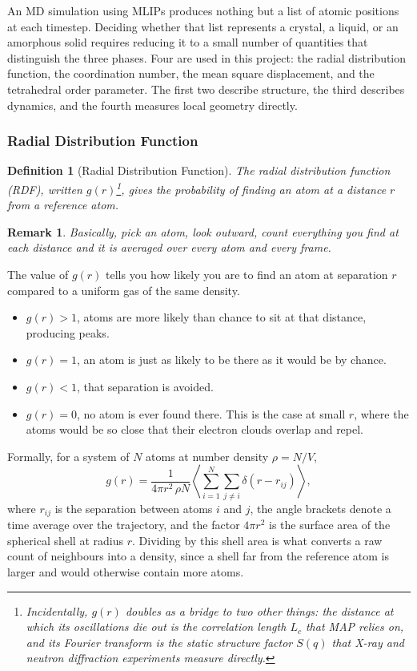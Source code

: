 \documentclass{article}
\newtheorem{definition}{Definition}
\newtheorem{remark}{Remark}
\begin{document}
An MD simulation using MLIPs produces nothing but a list of atomic positions at each timestep. Deciding whether that list represents a crystal, a liquid, or an amorphous solid requires reducing it to a small number of quantities that distinguish the three phases. Four are used in this project: the radial distribution function, the coordination number, the mean square displacement, and the tetrahedral order parameter. The first two describe structure, the third describes dynamics, and the fourth measures local geometry directly.

\subsubsection{Radial Distribution Function}
\label{RDF}
\begin{definition}[Radial Distribution Function]
    The radial distribution function (RDF), written $g(r)$\footnote{Incidentally, $g(r)$ doubles as a bridge to two other things: the distance at which its oscillations die out is the correlation length $L_c$ that MAP relies on, and its Fourier transform is the static structure factor $S(q)$ that X-ray and neutron diffraction experiments measure directly.}, gives the probability of finding an atom at a distance $r$ from a reference atom.
\end{definition}
\begin{remark}
    Basically, pick an atom, look outward, count everything you find at each distance and it is averaged over every atom and every frame.
\end{remark}
The value of $g(r)$ tells you how likely you are to find an atom at separation $r$ compared to a uniform gas of the same density.
\begin{itemize}
    \item $g(r) > 1$, atoms are more likely than chance to sit at that distance, producing peaks.
    \item $g(r) = 1$, an atom is just as likely to be there as it would be by chance.
    \item $g(r) < 1$, that separation is avoided.
    \item $g(r) = 0$, no atom is ever found there. This is the case at small $r$, where the atoms would be so close that their electron clouds overlap and repel.
\end{itemize}

Formally, for a system of $N$ atoms at number density $\rho = N/V$,
\begin{equation}
    g(r) = \frac{1}{4\pi r^{2}\, \rho N} \left\langle \sum_{i=1}^{N} \sum_{j \neq i} \delta\!\left(r - r_{ij}\right) \right\rangle,
    \label{eq:rdf}
\end{equation}
where $r_{ij}$ is the separation between atoms $i$ and $j$, the angle brackets denote a time average over the trajectory, and the factor $4\pi r^{2}$ is the surface area of the spherical shell at radius $r$. Dividing by this shell area is what converts a raw count of neighbours into a density, since a shell far from the reference atom is larger and would otherwise contain more atoms.
\end{document}
